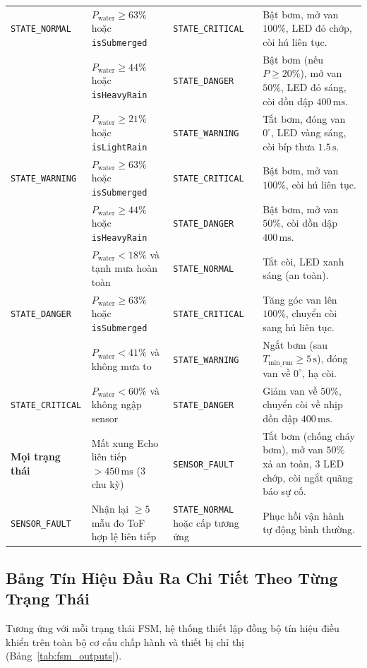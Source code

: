 \begin{longtable}{|>{\raggedright\arraybackslash}p{2.85cm}|>{\raggedright\arraybackslash}p{4.30cm}|>{\raggedright\arraybackslash}p{2.9cm}|>{\raggedright\arraybackslash}p{4.45cm}|}
\texttt{STATE\_NORMAL} & $P_{\text{water}} \ge 63\%$ hoặc \texttt{isSubmerged} & \texttt{STATE\_CRITICAL} & Bật bơm, mở van $100\%$, LED đỏ chớp, còi hú liên tục. \\
 & $P_{\text{water}} \ge 44\%$ hoặc \texttt{isHeavyRain} & \texttt{STATE\_DANGER} & Bật bơm (nếu $P \ge 20\%$), mở van $50\%$, LED đỏ sáng, còi dồn dập $400\,\text{ms}$. \\
 & $P_{\text{water}} \ge 21\%$ hoặc \texttt{isLightRain} & \texttt{STATE\_WARNING} & Tắt bơm, đóng van $0^\circ$, LED vàng sáng, còi bíp thưa $1.5\,\text{s}$. \\ \hline
\texttt{STATE\_WARNING} & $P_{\text{water}} \ge 63\%$ hoặc \texttt{isSubmerged} & \texttt{STATE\_CRITICAL} & Bật bơm, mở van $100\%$, còi hú liên tục. \\
 & $P_{\text{water}} \ge 44\%$ hoặc \texttt{isHeavyRain} & \texttt{STATE\_DANGER} & Bật bơm, mở van $50\%$, còi dồn dập $400\,\text{ms}$. \\
 & $P_{\text{water}} < 18\%$ và tạnh mưa hoàn toàn & \texttt{STATE\_NORMAL} & Tắt còi, LED xanh sáng (an toàn). \\ \hline
\texttt{STATE\_DANGER} & $P_{\text{water}} \ge 63\%$ hoặc \texttt{isSubmerged} & \texttt{STATE\_CRITICAL} & Tăng góc van lên $100\%$, chuyển còi sang hú liên tục. \\
 & $P_{\text{water}} < 41\%$ và không mưa to & \texttt{STATE\_WARNING} & Ngắt bơm (sau $T_{\text{min\_run}} \ge 5\,\text{s}$), đóng van về $0^\circ$, hạ còi. \\ \hline
\texttt{STATE\_CRITICAL} & $P_{\text{water}} < 60\%$ và không ngập sensor & \texttt{STATE\_DANGER} & Giảm van về $50\%$, chuyển còi về nhịp dồn dập $400\,\text{ms}$. \\ \hline
\textbf{Mọi trạng thái} & Mất xung Echo liên tiếp $> 450\,\text{ms}$ (3 chu kỳ) & \texttt{SENSOR\_FAULT} & Tắt bơm (chống cháy bơm), mở van $50\%$ xả an toàn, 3 LED chớp, còi ngắt quãng báo sự cố. \\ \hline
\texttt{SENSOR\_FAULT} & Nhận lại $\ge 5$ mẫu đo ToF hợp lệ liên tiếp & \texttt{STATE\_NORMAL} hoặc cấp tương ứng & Phục hồi vận hành tự động bình thường. \\ \hline
\end{longtable}
\endgroup

\subsection{Bảng Tín Hiệu Đầu Ra Chi Tiết Theo Từng Trạng Thái}
Tương ứng với mỗi trạng thái FSM, hệ thống thiết lập đồng bộ tín hiệu điều khiển trên toàn bộ cơ cấu chấp hành và thiết bị chỉ thị (Bảng~\ref{tab:fsm_outputs}).

